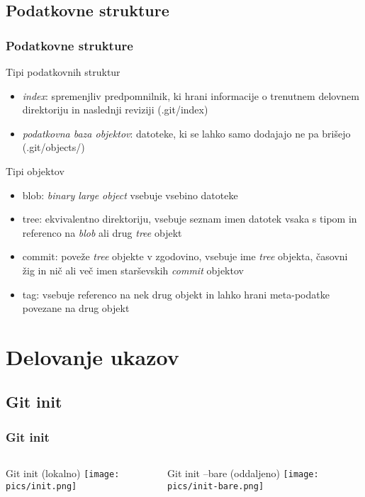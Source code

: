 \documentclass{beamer}
\begin{document}
\subsection{Podatkovne strukture}
\begin{frame}[shrink=12]
  \frametitle{Podatkovne strukture}
  \begin{block}{Tipi podatkovnih struktur}
    \begin{itemize}
      \item \emph{index}: spremenjliv predpomnilnik, ki hrani informacije o trenutnem
        delovnem direktoriju in naslednji reviziji (.git/index)
      \item \emph{podatkovna baza objektov}: datoteke, ki se lahko samo dodajajo
        ne pa brišejo (.git/objects/)
    \end{itemize}
  \end{block}
  \begin{block}{Tipi objektov}
    \begin{itemize}
      \item blob: \emph{binary large object} vsebuje vsebino datoteke
      \item tree: ekvivalentno direktoriju, vsebuje seznam imen datotek vsaka s
        tipom in referenco na \emph{blob} ali drug \emph{tree} objekt
      \item commit: poveže \emph{tree} objekte v zgodovino, vsebuje ime
        \emph{tree} objekta, časovni žig in nič ali več imen starševskih
        \emph{commit} objektov
      \item tag: vsebuje referenco na nek drug objekt in lahko hrani
        meta-podatke povezane na drug objekt
    \end{itemize}
  \end{block}
\end{frame}

\section{Delovanje ukazov}
\subsection{Git init}
\begin{frame}
  \frametitle{Git init}
  \begin{columns}[c]
    \begin{column}{.5\textwidth}
      \begin{block}{Git init (lokalno)}
        \texttt{[image: pics/init.png]}
      \end{block}
    \end{column}
    \begin{column}{.5\textwidth}
      \begin{block}{Git init --bare (oddaljeno)}
        \texttt{[image: pics/init-bare.png]}
      \end{block}
    \end{column}
  \end{columns}
\end{frame}
\end{document}
